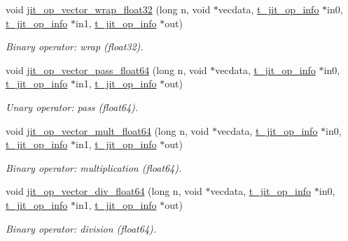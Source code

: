 \begin{DoxyCompactItemize}
void \hyperlink{group__opvecmod_gaddc46d0c5aa910a8e5dc04db16bcbb18}{jit\_\-op\_\-vector\_\-wrap\_\-float32} (long n, void $\ast$vecdata, \hyperlink{structt__jit__op__info}{t\_\-jit\_\-op\_\-info} $\ast$in0, \hyperlink{structt__jit__op__info}{t\_\-jit\_\-op\_\-info} $\ast$in1, \hyperlink{structt__jit__op__info}{t\_\-jit\_\-op\_\-info} $\ast$out)
\begin{DoxyCompactList}\small\item\em Binary operator: wrap (float32). \item\end{DoxyCompactList}\item 
void \hyperlink{group__opvecmod_ga1de814c8a85b052f304e5403c82a8b29}{jit\_\-op\_\-vector\_\-pass\_\-float64} (long n, void $\ast$vecdata, \hyperlink{structt__jit__op__info}{t\_\-jit\_\-op\_\-info} $\ast$in0, \hyperlink{structt__jit__op__info}{t\_\-jit\_\-op\_\-info} $\ast$in1, \hyperlink{structt__jit__op__info}{t\_\-jit\_\-op\_\-info} $\ast$out)
\begin{DoxyCompactList}\small\item\em Unary operator: pass (float64). \item\end{DoxyCompactList}\item 
void \hyperlink{group__opvecmod_ga6d9c3e715f7b275e11614dc58d2e9b4f}{jit\_\-op\_\-vector\_\-mult\_\-float64} (long n, void $\ast$vecdata, \hyperlink{structt__jit__op__info}{t\_\-jit\_\-op\_\-info} $\ast$in0, \hyperlink{structt__jit__op__info}{t\_\-jit\_\-op\_\-info} $\ast$in1, \hyperlink{structt__jit__op__info}{t\_\-jit\_\-op\_\-info} $\ast$out)
\begin{DoxyCompactList}\small\item\em Binary operator: multiplication (float64). \item\end{DoxyCompactList}\item 
void \hyperlink{group__opvecmod_ga508039e2b5d271fda853ff5cc16fd619}{jit\_\-op\_\-vector\_\-div\_\-float64} (long n, void $\ast$vecdata, \hyperlink{structt__jit__op__info}{t\_\-jit\_\-op\_\-info} $\ast$in0, \hyperlink{structt__jit__op__info}{t\_\-jit\_\-op\_\-info} $\ast$in1, \hyperlink{structt__jit__op__info}{t\_\-jit\_\-op\_\-info} $\ast$out)
\begin{DoxyCompactList}\small\item\em Binary operator: division (float64). \item\end{DoxyCompactList}\item 

\end{DoxyCompactItemize}
